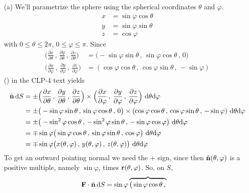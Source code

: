 \begin{solution}
 (a) We'll parametrize the sphere using the spherical coordinates $\theta$ and
$\varphi$.
\begin{align*}
x&=\sin\varphi\cos\theta \\
y&=\sin\varphi\sin\theta \\
z&=\cos\varphi
\end{align*}
with $0\le\theta\le 2\pi$, $0\le\varphi\le \pi$.
Since
\begin{align*}
\Big(\frac{\partial x}{\partial\theta}\,,\,
      \frac{\partial y}{\partial\theta}\,,\,
      \frac{\partial z}{\partial\theta}\Big)
&=\big(-\sin\varphi\sin\theta\,,\,
       \sin\varphi\cos\theta\,,\,0\big)\\
\Big(\frac{\partial x}{\partial\varphi}\,,\,\frac{\partial y}{\partial\varphi}
             \,,\, \frac{\partial z}{\partial\varphi}\Big)
&=(\cos\varphi\cos\theta\,,\,\cos\varphi\sin\theta\,,\,-\sin\varphi) 
\end{align*}
() in the CLP-4 text yields
\begin{align*}
\hat{\mathbf{n}}\,\mathrm{d}S
&=\pm\Big(\frac{\partial x}{\partial\theta}\,,\,
          \frac{\partial y}{\partial\theta}\,,\,
          \frac{\partial z}{\partial\theta}\Big)
\times
\Big(\frac{\partial x}{\partial\varphi}\,,\,\frac{\partial y}{\partial\varphi}
   \,,\, \frac{\partial z}{\partial\varphi}\Big)
\ \mathrm{d}\theta\mathrm{d}\varphi\\
&=\pm \big(-\sin\varphi\sin\theta\,,\,
       \sin\varphi\cos\theta\,,\,0\big)
\times
(\cos\varphi\cos\theta\,,\,\cos\varphi\sin\theta\,,\,-\sin\varphi)
\ \mathrm{d}\theta\mathrm{d}\varphi\\
&=\pm\big(-\sin^2\varphi\cos\theta\,,\,
          -\sin^2\varphi\sin\theta\,,\,
          -\sin\varphi\cos\varphi\big)\ \mathrm{d}\theta\mathrm{d}\varphi \\
&=\mp \sin\varphi \big(\sin\varphi\cos\theta\,,\,
          \sin\varphi\sin\theta\,,\,
          \cos\varphi\big)\ \mathrm{d}\theta\mathrm{d}\varphi  \\
&=\mp \sin\varphi \big(x(\theta,\varphi)\,,\,
          y(\theta,\varphi)\,,\,
          z(\theta,\varphi)\big)\ \mathrm{d}\theta\mathrm{d}\varphi 
\end{align*}
To get an outward pointing normal we need the $+$ sign, since then
$\hat{\mathbf{n}}(\theta,\varphi)$ is a positive multiple, namely $\sin\varphi$,
times $\mathbf{r}(\theta,\varphi)$. So, on $S$,
\begin{align*}
\mathbf{F}\cdot\hat{\mathbf{n}}\,\mathrm{d}S
  &= \sin\varphi \overbrace{\big(\sin\varphi\cos\theta\,,\,
}
\end{align*}
\end{solution}
